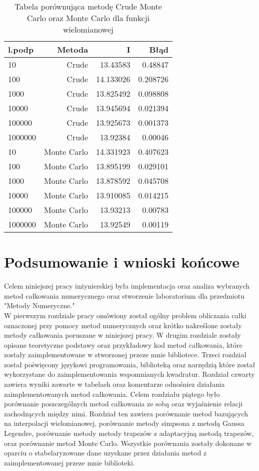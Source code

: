 \documentclass[12pt,twoside]{article}
\begin{document}
\begin{table}[H]
\centering 
\caption{Tabela porównująca metodę Crude Monte Carlo oraz Monte Carlo dla funkcji wielomianowej}
\label{tabela9.7}
\begin{tabular}{lrrr}
\toprule
{l.podp} & Metoda &  I &  Błąd \\
\midrule
10  &     Crude & 13.43583  &   0.48847 \\
100  &     Crude & 14.133026 &   0.208726 \\
1000  &    Crude & 13.825492  &   0.098808  \\
10000  &    Crude & 13.945694  &   0.021394  \\
100000  &    Crude & 13.925673 &    0.001373   \\
1000000  &    Crude & 13.92384 &    0.00046   \\
\midrule
10  &     Monte Carlo & 14.331923  &   0.407623 \\
100  &     Monte Carlo & 13.895199 &   0.029101\\
1000  &    Monte Carlo & 13.878592   &   0.045708  \\
10000  &    Monte Carlo & 13.910085  &   0.014215  \\
100000  &    Monte Carlo & 13.93213 &    0.00783   \\
1000000  &    Monte Carlo & 13.92549 &    0.00119   \\
\bottomrule
\end{tabular}
\end{table}


\section{Podsumowanie i wnioski końcowe}

Celem niniejszej pracy inżynierskiej była implementacja oraz analiza wybranych metod całkowania numerycznego oraz stworzenie laboratorium dla przedmiotu "Metody Numeryczne."\\
	W pierwszym rozdziale pracy omówiony został ogólny problem obliczania całki oznaczonej przy pomocy metod numerycznych oraz krótko nakreślone zostały metody całkowania poruszane w niniejszej pracy. 
	W drugim rozdziale zostały opisane teoretyczne podstawy oraz przykładowy kod metod całkowania, które zostały zaimplementowane w stworzonej przeze mnie bibliotece. 
	Trzeci rozdział został poświęcony językowi programowania, biblioteką oraz narzędzią które został wykorzystane do zaimplementowania wspomnianych kwadratur.
	Rozdział czwarty zawiera  wyniki zawarte w tabelach oraz komentarze odnośniez działania zaimplementowanych metod całkowania.
	Celem rozdziału piątego było porównanie poszczególnych metod całkowania ze sobą  oraz wyjaśnienie relacji zachodzących między nimi. Rozdział ten zawiera porównanie metod bazujących na interpolacji wielomianowej, porównanie metody simpsona z metodą Gaussa Legendre, porównanie metody metody trapezów z adaptacyjną metodą trapezów, oraz porównanie metod Monte Carlo. Wszystkie porównania zostały dokonane w oparciu o stabelaryzowane dane uzyskane przez działania metod z zaimplementowanej przeze mnie biblioteki. 
\end{document}
